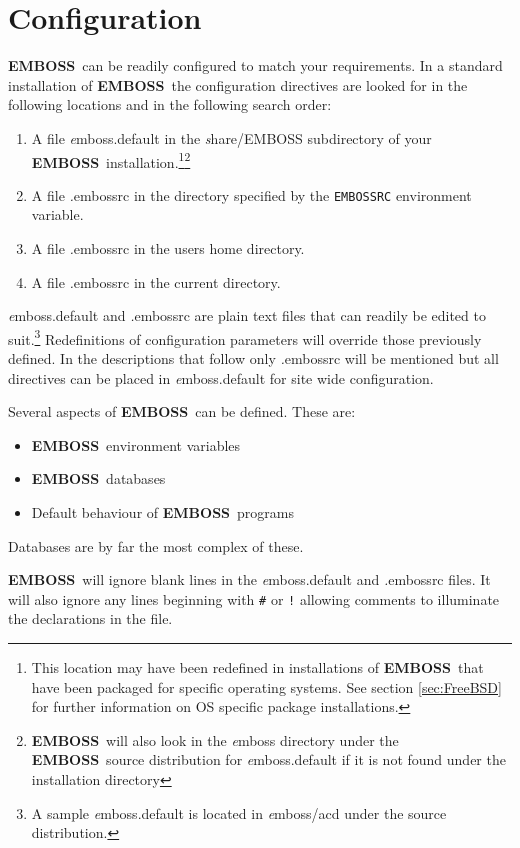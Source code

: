 \documentclass{report}
\newcommand{\ilcomm}[1]{{\tt #1}}
\newcommand{\filename}[1]{{\sf\textsl #1}}
\newcommand{\EMBOSS}{{\sf\bfseries EMBOSS}}
\begin{document}
\chapter{Configuration}
 
\EMBOSS\ can be readily configured to match your requirements. In a standard installation of \EMBOSS\ the configuration directives are looked for in the following locations and in the following search order:
\begin{enumerate}
\item A file \filename{emboss.default} in the \filename{share/EMBOSS} subdirectory of your \EMBOSS\ installation.\footnote{This location may have been redefined in installations of \EMBOSS\ that have been packaged for specific operating systems. See section \ref{sec:FreeBSD} for further information on OS specific package installations.}\footnote{\EMBOSS\ will also look in the \filename{emboss} directory under the \EMBOSS\ source distribution for \filename{emboss.default} if it is not found under the installation directory}
\item A file \filename{.embossrc} in the directory specified by the \ilcomm{EMBOSSRC} environment variable.
\item A file \filename{.embossrc} in the users home directory.
\item A file \filename{.embossrc} in the current directory.
\end{enumerate}
\filename{emboss.default} and \filename{.embossrc} are plain text files that can readily be edited to suit.\footnote{A sample \filename{emboss.default} is located in \filename{emboss/acd} under the  source distribution.} Redefinitions of configuration parameters will override those previously defined. In the descriptions that follow only \filename{.embossrc} will be mentioned but all directives can be placed in \filename{emboss.default} for site wide configuration.

Several aspects of \EMBOSS\ can be defined. These are:
\begin{itemize}
\item\EMBOSS\ environment variables
\item\EMBOSS\ databases
\item Default behaviour of \EMBOSS\ programs
\end{itemize}
Databases are by far the most complex of these. 

\EMBOSS\ will ignore blank lines in the \filename{emboss.default} and \filename{.embossrc} files. It will also ignore any lines beginning with \ilcomm{\#} or \ilcomm{!} allowing comments to illuminate the declarations in the file.
\end{document}
